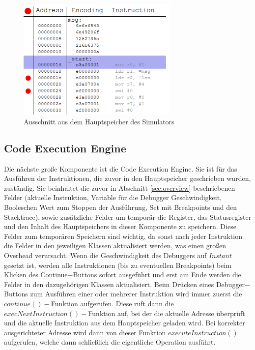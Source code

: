 \documentclass[a4paper, 11pt, onecolumn]{article}
\begin{document}
\begin{figure}[!htb]
\centering
\includegraphics[width=0.7\textwidth]{data/memory}
\caption{Ausschnitt aus dem Hauptspeicher des Simulators}
\label{fig:memory}
\end{figure}

\subsection{Code Execution Engine}\label{sec:codeExecEngine}

Die nächste große Komponente ist die Code Execution Engine. Sie ist für das Ausführen der Instruktionen, die zuvor in den Hauptspeicher geschrieben wurden, zuständig. Sie beinhaltet die zuvor in Abschnitt \ref{sec:overview} beschriebenen Felder (aktuelle Instruktion, Variable für die Debugger Geschwindigkeit, Booleschen Wert zum Stoppen der Ausführung, Set mit Breakpoints und den Stacktrace), sowie zusätzliche Felder um temporär die Register, das Statusregister und den Inhalt des Hauptspeichers in dieser Komponente zu speichern. Diese Felder zum temporären Speichern sind wichtig, da sonst nach jeder Instruktion die Felder in den jeweiligen Klassen aktualisiert werden, was einen großen Overhead verursacht. Wenn die Geschwindigkeit des Debuggers auf $Instant$ gesetzt ist, werden alle Instruktionen (bis zu eventuellen Breakpoints) beim Klicken des Continue$-$Buttons sofort ausgeführt und erst am Ende werden die Felder in den dazugehörigen Klassen aktualisiert. Beim Drücken eines Debugger$-$Buttons zum Ausführen einer oder mehrerer Instruktion wird immer zuerst die $continue()-$Funktion aufgerufen. Diese ruft dann die  $execNextInstruction()-$Funktion auf, bei der die aktuelle Adresse überprüft und die aktuelle Instruktion aus dem Hauptspeicher geladen wird. Bei korrekter ausgerichteter Adresse wird dann von dieser Funktion $executeInstruction()$ aufgerufen, welche dann schließlich die eigentliche Operation ausführt. 
\end{document}
